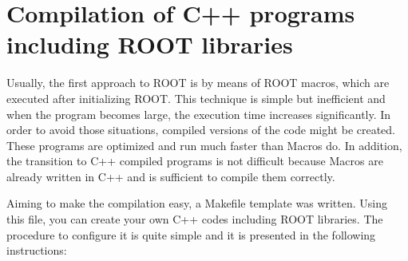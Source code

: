 \documentclass[12pt, oneside]{book}              %
\begin{document}
\section[C++ and ROOT Makefile]{Compilation of C++ programs including ROOT libraries} \label{sec:Root_makefile}

Usually, the first approach to ROOT is by means of ROOT macros, which 
are executed after initializing ROOT. This technique is simple but
inefficient and when the program becomes large, the execution time
increases significantly. In order to avoid those situations, compiled
versions of the code might be created. These programs are optimized and
run much faster than Macros do. In addition, the transition to C++ 
compiled programs is not difficult because Macros are already written
in C++ and is sufficient to compile them correctly. 

Aiming to make the compilation easy, a Makefile template was written.
Using this file, you can create your own C++ codes including ROOT 
libraries. The procedure to configure it is quite simple and it is
presented in the following instructions:
\end{document}
